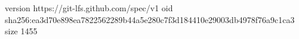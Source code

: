 version https://git-lfs.github.com/spec/v1
oid sha256:ea3d70e898ea7822562289b44a5e280c7f3d184410e29003db4978f76a9c1ca3
size 1455

